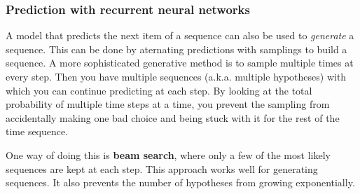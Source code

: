 \subsubsection{Prediction with recurrent neural networks}

A model that predicts the next item of a sequence can also be used to \textit{generate} a sequence. This can be done by aternating predictions with samplings to build a sequence. A more sophisticated generative method is to sample multiple times at every step. Then you have multiple sequences (a.k.a. multiple hypotheses) with which you can continue predicting at each step. By looking at the total probability of multiple time steps at a time, you prevent the sampling from accidentally making one bad choice and being stuck with it for the rest of the time sequence. 

One way of doing this is \textbf{beam search}, where only a few of the most likely sequences are kept at each step. This approach works well for generating sequences. It also prevents the number of hypotheses from growing exponentially. 

